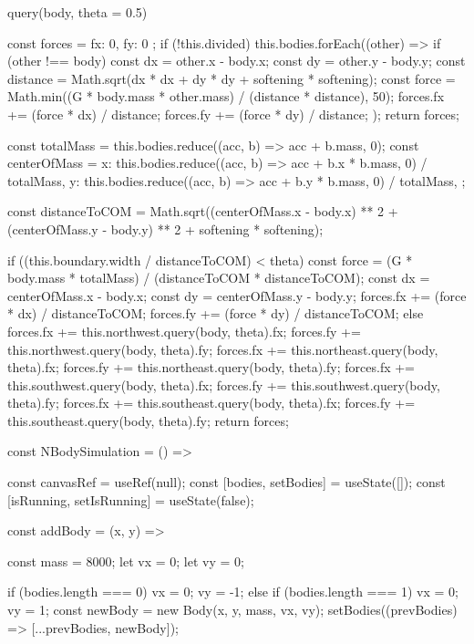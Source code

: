 \documentclass[a4paper,12pt,twoside]{article}
\begin{document}
\begin{javascript}
{    query(body, theta = 0.5) {
        const forces = { fx: 0, fy: 0 };
        if (!this.divided) {
            this.bodies.forEach((other) => {
                if (other !== body) {
                    const dx = other.x - body.x;
                    const dy = other.y - body.y;
                    const distance = Math.sqrt(dx * dx + dy * dy + softening * softening);
                    const force = Math.min((G * body.mass * other.mass) / (distance * distance), 50);
                    forces.fx += (force * dx) / distance;
                    forces.fy += (force * dy) / distance;
                }
            });
            return forces;
        }

        const totalMass = this.bodies.reduce((acc, b) => acc + b.mass, 0);
        const centerOfMass = {
            x: this.bodies.reduce((acc, b) => acc + b.x * b.mass, 0) / totalMass,
            y: this.bodies.reduce((acc, b) => acc + b.y * b.mass, 0) / totalMass,
        };

        const distanceToCOM = Math.sqrt((centerOfMass.x - body.x) ** 2 + (centerOfMass.y - body.y) ** 2 + softening * softening);

        if ((this.boundary.width / distanceToCOM) < theta) {
            const force = (G * body.mass * totalMass) / (distanceToCOM * distanceToCOM);
            const dx = centerOfMass.x - body.x;
            const dy = centerOfMass.y - body.y;
            forces.fx += (force * dx) / distanceToCOM;
            forces.fy += (force * dy) / distanceToCOM;
        } else {
            forces.fx += this.northwest.query(body, theta).fx;
            forces.fy += this.northwest.query(body, theta).fy;
            forces.fx += this.northeast.query(body, theta).fx;
            forces.fy += this.northeast.query(body, theta).fy;
            forces.fx += this.southwest.query(body, theta).fx;
            forces.fy += this.southwest.query(body, theta).fy;
            forces.fx += this.southeast.query(body, theta).fx;
            forces.fy += this.southeast.query(body, theta).fy;
        }
        return forces;
    }
}

const NBodySimulation = () => {
    const canvasRef = useRef(null);
    const [bodies, setBodies] = useState([]);
    const [isRunning, setIsRunning] = useState(false);

    const addBody = (x, y) => {
        const mass = 8000;
        let vx = 0;
        let vy = 0;

        if (bodies.length === 0) {
            vx = 0;
            vy = -1;
        } else if (bodies.length === 1) {
            vx = 0;
            vy = 1;
        }
        const newBody = new Body(x, y, mass, vx, vy);
        setBodies((prevBodies) => [...prevBodies, newBody]);
    }

}
\end{javascript}
\end{document}
